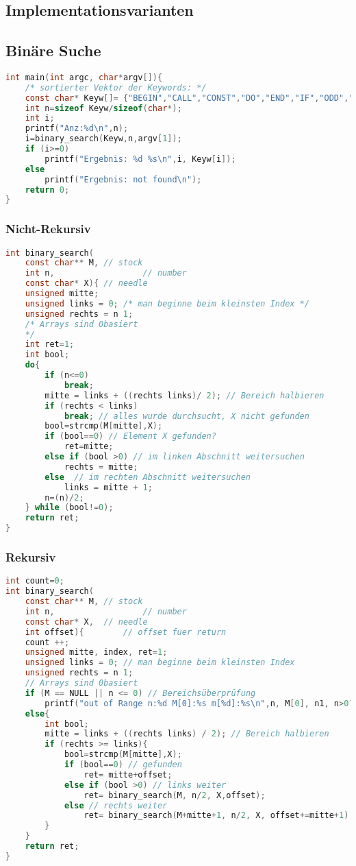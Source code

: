 \subsection*{Implementationsvarianten}
\subsection{Binäre Suche}
\begin{lstlisting}[language=C]
int main(int argc, char*argv[]){
	/* sortierter Vektor der Keywords: */
	const char* Keyw[]= {"BEGIN","CALL","CONST","DO","END","IF","ODD","PROCEDURE","THEN","VAR","WHILE"};
	int n=sizeof Keyw/sizeof(char*);
	int i;
	printf("Anz:%d\n",n);
	i=binary_search(Keyw,n,argv[1]);
	if (i>=0)
		printf("Ergebnis: %d %s\n",i, Keyw[i]);
	else 
		printf("Ergebnis: not found\n");
	return 0;
}
\end{lstlisting}
\subsubsection*{Nicht-Rekursiv}
\begin{lstlisting}[language=C]
int binary_search(
	const char** M,	// stock
	int n,					// number
	const char* X){	// needle
	unsigned mitte;
	unsigned links = 0; /* man beginne beim kleinsten Index */
	unsigned rechts = n 1;
	/* Arrays sind 0basiert
	*/
	int ret=1;
	int bool;
	do{
		if (n<=0)
			break;
		mitte = links + ((rechts links)/ 2); // Bereich halbieren
		if (rechts < links)
			break; // alles wurde durchsucht, X nicht gefunden
		bool=strcmp(M[mitte],X);
		if (bool==0) // Element X gefunden?
			ret=mitte; 
		else if (bool >0) // im linken Abschnitt weitersuchen
			rechts = mitte; 
		else  // im rechten Abschnitt weitersuchen
			links = mitte + 1;
		n=(n)/2;
	} while (bool!=0);
	return ret;
}
\end{lstlisting}
\subsubsection*{Rekursiv}
\begin{lstlisting}[language=C]
int count=0;
int binary_search(
	const char** M,	// stock
	int n,					// number
	const char* X,	// needle
	int offset){		// offset fuer return
	count ++;
	unsigned mitte, index, ret=1;
	unsigned links = 0; // man beginne beim kleinsten Index
	unsigned rechts = n 1;
	// Arrays sind 0basiert
	if (M == NULL || n <= 0) // Bereichsüberprüfung
		printf("out of Range n:%d M[0]:%s m[%d]:%s\n",n, M[0], n1, n>0? M[n1]:"OutOfRange");
	else{
		int bool;
		mitte = links + ((rechts links) / 2); // Bereich halbieren
		if (rechts >= links){
			bool=strcmp(M[mitte],X);
			if (bool==0) // gefunden
				ret= mitte+offset; 
			else if (bool >0) // links weiter
				ret= binary_search(M, n/2, X,offset); 
			else // rechts weiter
				ret= binary_search(M+mitte+1, n/2, X, offset+=mitte+1);
		}
	}
	return ret;
}
\end{lstlisting}


